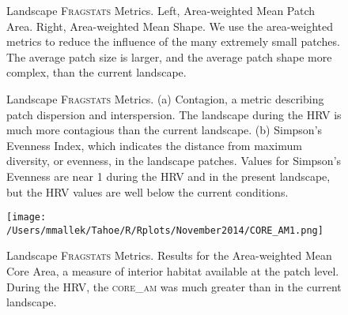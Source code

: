 \clearpage

\begin{figure}[!htbp]
  \centering
\caption{Landscape \textsc{Fragstats} Metrics. Left, Area-weighted Mean Patch Area. Right, Area-weighted Mean Shape. We use the area-weighted metrics to reduce the influence of the many extremely small patches. The average patch size is larger, and the average patch shape more complex, than the current landscape.} 
\label{fig:fragland_areashape}
\end{figure}

\begin{figure}[!htbp]
  \centering
\caption{Landscape \textsc{Fragstats} Metrics. (a) Contagion, a metric describing patch dispersion and interspersion. The landscape during the HRV is much more contagious than the current landscape. (b) Simpson's Evenness Index, which indicates the distance from maximum diversity, or evenness, in the landscape patches. Values for Simpson's Evenness are near 1 during the HRV and in the present landscape, but the HRV values are well below the current conditions.} 
\label{fig:fragland_contagsiei}
\end{figure}

\begin{figure}[!htbp]
  \centering
  \texttt{[image: /Users/mmallek/Tahoe/R/Rplots/November2014/CORE\_AM1.png]}
\caption{Landscape \textsc{Fragstats} Metrics. Results for the Area-weighted Mean Core Area, a measure of interior habitat available at the patch level. During the HRV, the \textsc{core\_am} was much greater than in the current landscape.} 
\label{fig:fragland_core}
\end{figure}

